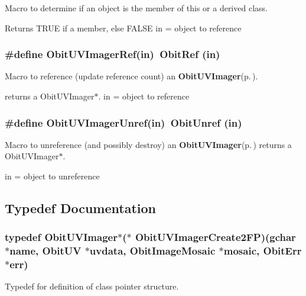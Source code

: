 Macro to determine if an object is the member of this or a derived class. 

Returns TRUE if a member, else FALSE in = object to reference 
\subsubsection{\setlength{\rightskip}{0pt plus 5cm}\#define Obit\-UVImager\-Ref(in)\ Obit\-Ref (in)}\label{ObitUVImager_8h_a1}


Macro to reference (update reference count) an {\bf Obit\-UVImager}{\rm (p.\,\pageref{structObitUVImager})}. 

returns a Obit\-UVImager$\ast$. in = object to reference 
\subsubsection{\setlength{\rightskip}{0pt plus 5cm}\#define Obit\-UVImager\-Unref(in)\ Obit\-Unref (in)}\label{ObitUVImager_8h_a0}


Macro to unreference (and possibly destroy) an {\bf Obit\-UVImager}{\rm (p.\,\pageref{structObitUVImager})} returns a Obit\-UVImager$\ast$. 

in = object to unreference 

\subsection{Typedef Documentation}
\subsubsection{\setlength{\rightskip}{0pt plus 5cm}typedef {\bf Obit\-UVImager}$\ast$($\ast$ {\bf Obit\-UVImager\-Create2FP})(gchar $\ast$name, {\bf Obit\-UV} $\ast$uvdata, {\bf Obit\-Image\-Mosaic} $\ast$mosaic, {\bf Obit\-Err} $\ast$err)}\label{ObitUVImager_8h_a5}


Typedef for definition of class pointer structure. 

